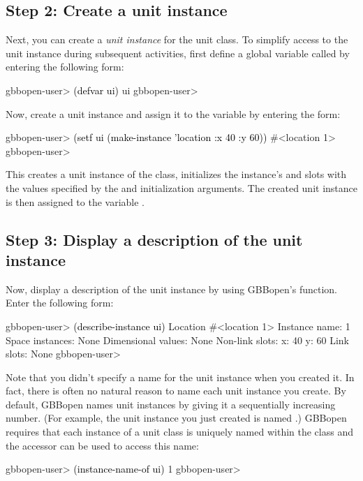 \documentclass[10pt,twoside,english,pdftex]{article}
\begin{document}
\subsection*{Step 2: Create a unit instance}

%
%
Next, you can create a \textit{unit instance\/} for the 
unit class.  To simplify access to the unit instance during subsequent
activities, first define a global variable called  by entering the
following form:
%
\W\supp
\begin{example}
\textcolor{darkergray}{%
  gbbopen-user> \textcolor{black}{(defvar ui)}
  ui
  gbbopen-user>}
\end{example}

%
%
Now, create a unit instance and assign it to the variable  by
entering the form:
%
\W\supp\notpretop
\begin{example}
\textcolor{darkergray}{%
  gbbopen-user> \textcolor{black}{(setf ui (make-instance 'location :x 40 :y 60))}
  #<location 1>
  gbbopen-user>}
\end{example}

This creates a unit instance of the  class, initializes
the instance's  and  slots with the values specified by the
 and  initialization arguments.  The created unit instance
is then assigned to the variable .

\subsection*{Step 3: Display a description of the unit instance}

%
%
%
Now, display a description of the unit instance by using GBBopen's
 function.  Enter the following form:
%
\W\supp
\begin{example}
\textcolor{darkergray}{%
  gbbopen-user> \textcolor{black}{(describe-instance ui)}
  Location #<location 1>
    Instance name: 1
    Space instances: None
    Dimensional values: None
    Non-link slots:
      x:  40
      y:  60
    Link slots: None
  gbbopen-user>}
\end{example}

%
Note that you didn't specify a name for the unit instance when you created it.
In fact, there is often no natural reason to name each unit instance you
create. By default, GBBopen names unit instances by giving it a sequentially
increasing number.  (For example, the unit instance you just created is named
.)  GBBopen requires that each instance of a unit class is uniquely
named within the class and the accessor  can
be used to access this name:
%
\W\supp
\begin{example}
\textcolor{darkergray}{%
  gbbopen-user> \textcolor{black}{(instance-name-of ui)}
  1
  gbbopen-user>}
\end{example}
\end{document}
